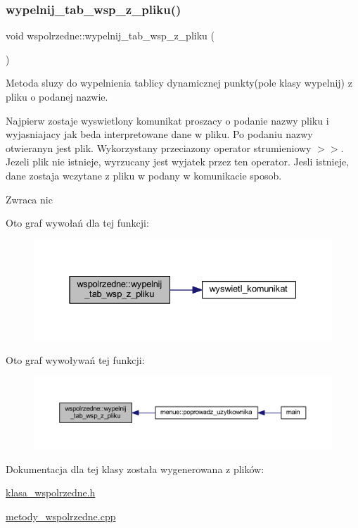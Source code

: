 \subsubsection{\texorpdfstring{wypelnij\+\_\+tab\+\_\+wsp\+\_\+z\+\_\+pliku()}{wypelnij\_tab\_wsp\_z\_pliku()}}
{\footnotesize\ttfamily void wspolrzedne\+::wypelnij\+\_\+tab\+\_\+wsp\+\_\+z\+\_\+pliku (\begin{DoxyParamCaption}{ }\end{DoxyParamCaption})}

Metoda sluzy do wypelnienia tablicy dynamicznej punkty(pole klasy wypelnij) z pliku o podanej nazwie.

Najpierw zostaje wyswietlony komunikat proszacy o podanie nazwy pliku i wyjasniajacy jak beda interpretowane dane w pliku. Po podaniu nazwy otwieranyn jest plik. Wykorzystany przeciazony operator strumieniowy $>$$>$. Jezeli plik nie istnieje, wyrzucany jest wyjatek przez ten operator. Jesli istnieje, dane zostaja wczytane z pliku w podany w komunikacie sposob. \begin{DoxyReturn}{Zwraca}
nic 
\end{DoxyReturn}
Oto graf wywołań dla tej funkcji\+:
\nopagebreak
\begin{figure}[H]
\begin{center}
\leavevmode
\includegraphics[width=331pt]{classwspolrzedne_a9fcebd535a4a970e7007be5b13791fbf_cgraph}
\end{center}
\end{figure}
Oto graf wywoływań tej funkcji\+:
\nopagebreak
\begin{figure}[H]
\begin{center}
\leavevmode
\includegraphics[width=350pt]{classwspolrzedne_a9fcebd535a4a970e7007be5b13791fbf_icgraph}
\end{center}
\end{figure}


Dokumentacja dla tej klasy została wygenerowana z plików\+:\begin{DoxyCompactItemize}
\item 
\mbox{\hyperlink{klasa__wspolrzedne_8h}{klasa\+\_\+wspolrzedne.\+h}}\item 
\mbox{\hyperlink{metody__wspolrzedne_8cpp}{metody\+\_\+wspolrzedne.\+cpp}}\end{DoxyCompactItemize}
